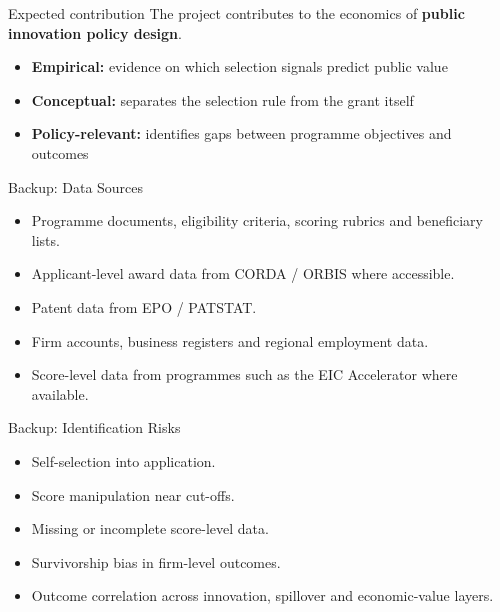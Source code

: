 \documentclass[aspectratio=169]{beamer}
\newcommand{\highlight}[1]{\textcolor{VeronaBlue}{\textbf{#1}}}
\begin{document}
\begin{frame}{Expected contribution}
  \large The project contributes to the economics of \highlight{public innovation policy design}.
  \vspace{0.35cm}
  \normalsize
  \begin{itemize}
  \item \highlight{Empirical:} evidence on which selection signals predict public value
  \item \highlight{Conceptual:} separates the selection rule from the grant itself
  \item \highlight{Policy-relevant:} identifies gaps between programme objectives and outcomes
  \end{itemize}

\end{frame}

\begin{frame}{Backup: Data Sources}
  \begin{itemize}
    \item Programme documents, eligibility criteria, scoring rubrics and beneficiary lists.
    \item Applicant-level award data from CORDA / ORBIS where accessible.
    \item Patent data from EPO / PATSTAT.
    \item Firm accounts, business registers and regional employment data.
    \item Score-level data from programmes such as the EIC Accelerator where available.
  \end{itemize}
\end{frame}

\begin{frame}{Backup: Identification Risks}
  \begin{itemize}
    \item Self-selection into application.
    \item Score manipulation near cut-offs.
    \item Missing or incomplete score-level data.
    \item Survivorship bias in firm-level outcomes.
    \item Outcome correlation across innovation, spillover and economic-value layers.
  \end{itemize}
\end{frame}
\end{document}
